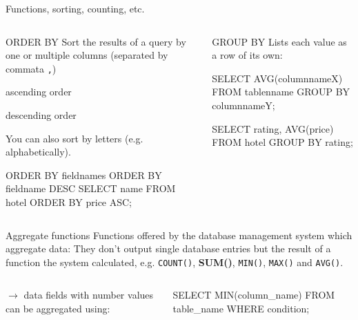 \begin{frame}{Functions, sorting, counting, etc.}
\framebreak 



\begin{columns}
\begin{block}{ORDER BY}\footnotesize
Sort the results of a query by one or multiple columns (separated by commata \texttt{,}) 
\begin{description}\scriptsize
\item[ASC] ascending order
\item[DESC] descending order
\end{description}
You can also sort by letters (e.g. alphabetically).

\begin{sqlcode}
ORDER BY fieldnames 
ORDER BY fieldname DESC 
SELECT name FROM hotel 
ORDER BY price ASC;
\end{sqlcode}
\end{block}

\begin{block}{GROUP BY}\footnotesize
Lists each value as a row of its own:
  \begin{sqlcode}
SELECT AVG(columnnameX) 
FROM tablenname 
GROUP BY columnnameY;

SELECT rating, AVG(price)
FROM hotel 
GROUP BY rating;
\end{sqlcode}
\end{block}
\end{columns}

\framebreak

\begin{block}{Aggregate functions}\footnotesize
Functions offered by the database management system which aggregate data: They don't output single database entries but the result of a function the system calculated, e.g. \texttt{COUNT()}, \textbf{SUM()}, \texttt{MIN()}, \texttt{MAX()} and \texttt{AVG()}.
\end{block}
\bigskip

\begin{columns}
\begin{block}{}\footnotesize %
$\to$ data fields with number values can be aggregated using:


\end{block}
  \begin{sqlcode}
SELECT MIN(column_name)
FROM table_name
WHERE condition;
\end{sqlcode}


\end{columns}
\end{frame}
